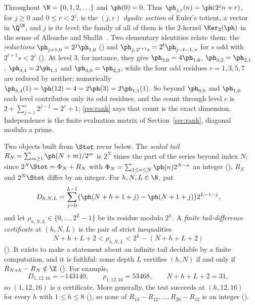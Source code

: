 Throughout $\N=\{0,1,2,\ldots\}$ and $\ph(0)=0$.  Thus
$\ph_{j,r}(n)=\ph(2^jn+r)$, for $j\ge0$ and $0\le r<2^j$, is the
$(j,r)$ \emph{dyadic section} of Euler's totient, a vector in $\Q^{\N}$, and
$j$ is its \emph{level}; the family of all of them is the $2$-kernel
$\Ker_2(\ph)$ in the sense of Allouche and Shallit~\cite{allouche-shallit}.
Two elementary identities relate them: the \emph{reductions}
$\ph_{j+1,0}=2^{j}\ph_{1,0}$
()
and $\ph_{j,\,2^{t+1}s}=2^{t}\ph_{j-t-1,\,s}$ for $s$ odd with $2^{t+1}s<2^j$
().
At level $3$, for instance, they give $\ph_{3,0}=4\ph_{1,0}$,
$\ph_{3,2}=\ph_{2,1}$, $\ph_{3,4}=2\ph_{1,1}$ and $\ph_{3,6}=\ph_{2,3}$, while
the four odd residues $r=1,3,5,7$ are reduced by neither; numerically
$\ph_{3,4}(1)=\ph(12)=4=2\ph(3)=2\ph_{1,1}(1)$.  So beyond $\ph_{0,0}$ and
$\ph_{1,0}$ each level contributes only its odd residues, and the count
through level $e$ is $2+\sum_{j=1}^{e}2^{j-1}=2^e+1$; \ref{res:rank} says that
count is the exact dimension.  Independence is the finite evaluation matrix of Section~\ref{sec:rank}, diagonal modulo a prime.

Two objects built from $\Stot$ recur below.  The \emph{scaled tail}
$R_N=\sum_{m\ge1}\ph(N+m)/2^m$ is $2^N$ times the part of the series beyond
index $N$; since $2^N\Stot=\Phi_N+R_N$ with
$\Phi_N=\sum_{1\le n\le N}\ph(n)2^{N-n}$ an integer
(),
$R_N$ and $2^N\Stot$ differ by an integer.  For $h,N,L\in\N$, put
\[
  D_{h,N,L}
  =
  \sum_{j=0}^{L-1}
  \bigl(\ph(N+h+1+j)-\ph(N+1+j)\bigr)2^{L-1-j},
\]
and let $\rho_{h,N,L}\in\{0,\dots,2^L-1\}$ be its residue modulo $2^L$.
A \emph{finite tail-difference certificate} at $(h,N,L)$ is the pair of
strict inequalities
\[
  N+h+L+2<\rho_{h,N,L}<2^L-(N+h+L+2)
\]
().
It exists to make a statement about an infinite tail decidable by a finite
computation, and it is faithful: some depth $L$ certifies $(h,N)$ if and only
if $R_{N+h}-R_N\notin\Z$
().
For example,
\[
  D_{1,12,16}=-143140,\qquad
  \rho_{1,12,16}=53468,\qquad N+h+L+2=31,
\]
so $(1,12,16)$ is a certificate.  More generally, the test succeeds at
$(h,12,16)$ for every $h$ with $1\le h\le8$
(),
so none of $R_{13}-R_{12},\dots,R_{20}-R_{12}$ is an integer
().


